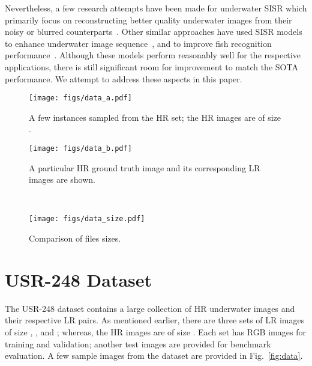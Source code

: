 \documentclass[10pt,twocolumn,letterpaper]{article}
\begin{document}
Nevertheless, a few research attempts have been made for underwater SISR which primarily focus on reconstructing better quality underwater images from their noisy or blurred counterparts~\cite{chen2012model,fan2010application,yu2007system}. 
Other similar approaches have used SISR models to enhance underwater image sequence~\cite{quevedo2017underwater}, and to improve fish recognition performance~\cite{sun2016fish}.     
Although these models perform reasonably well for the respective applications, there is still significant room for improvement to match the SOTA performance. We attempt to address these aspects in this paper.




\begin{figure*}[ht]
	\centering
	\begin{subfigure}{0.98\textwidth}
		\centering
		\texttt{[image: figs/data\_a.pdf]} 
		\caption{A few instances sampled from the HR set; the HR images are of size .}
		\label{data_a}
	\end{subfigure}
	\vspace{2mm}
	
	\begin{subfigure}{0.75\textwidth} 
		\centering
		\texttt{[image: figs/data\_b.pdf]} 
		\caption{A particular HR ground truth image and its corresponding LR images are shown.}
		\label{data_b}
	\end{subfigure}~
	\begin{subfigure}{0.24\textwidth} 
		\centering
		\texttt{[image: figs/data\_size.pdf]} 
		\caption{Comparison of files sizes.}
		\label{data_c}
	\end{subfigure}
	\caption{The proposed USR-248 dataset has one HR set and three corresponding LR sets of images; hence, there are three possible combinations (\ie,  ,  and ) for supervised training of SISR models.}
	\vspace{-2mm}
	\label{fig:data}
\end{figure*}
 

\section{USR-248 Dataset}
The USR-248 dataset contains a large collection of HR underwater images and their respective LR pairs. As mentioned earlier, there are three sets of LR images of size , , and ; whereas, the HR images are of size . Each set has  RGB images for training and validation; another  test images are provided for benchmark evaluation. A few sample images from the dataset are provided in Fig.~\ref{fig:data}. 
\end{document}
